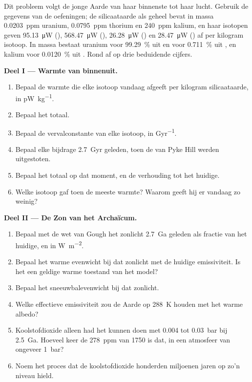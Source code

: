 \begin{problem}\label{pb:b2:precambrian-earth:1}
Dit probleem volgt de jonge Aarde van haar binnenste tot haar lucht. Gebruik de gegevens van de
oefeningen; de silicaataarde als geheel bevat in massa \qty{0.0203}{ppm} uranium, \qty{0.0795}{ppm}
thorium en \qty{240}{ppm} kalium, en haar isotopen geven \qty{95.13}{\micro W}
(), \qty{568.47}{\micro W} (), \qty{26.28}{\micro W} () en
\qty{28.47}{\micro W} () af per kilogram isotoop. In massa bestaat uranium voor
\qty{99.29}{\percent} uit  en voor \qty{0.711}{\percent} uit , en kalium voor
\qty{0.0120}{\percent} uit . Rond af op drie beduidende cijfers.

\noindent\textbf{Deel I --- Warmte van binnenuit.}
\begin{enumerate}
  \item Bepaal de warmte die elke isotoop vandaag afgeeft per kilogram silicaataarde, in
        \unit{pW.kg^{-1}}.
  \item Bepaal het totaal.
  \item Bepaal de vervalconstante van elke isotoop, in \unit{Gyr^{-1}}.
  \item Bepaal elke bijdrage \qty{2.7}{Gyr} geleden, toen de  van Pyke Hill werden uitgestoten.
  \item Bepaal het totaal op dat moment, en de verhouding tot het huidige.
  \item Welke isotoop gaf toen de meeste warmte? Waarom geeft hij er vandaag zo weinig?
\end{enumerate}

\noindent\textbf{Deel II --- De Zon van het Archaïcum.}
\begin{enumerate}[resume]
  \item Bepaal met de wet van Gough het zonlicht \qty{2.7}{Ga} geleden als fractie van het huidige, en in
        \unit{W.m^{-2}}.
  \item Bepaal het warme evenwicht bij dat zonlicht met de huidige emissiviteit. Is het een geldige warme
        toestand van het model?
  \item Bepaal het sneeuwbalevenwicht bij dat zonlicht.
  \item Welke effectieve emissiviteit zou de Aarde op \qty{288}{K} houden met het warme albedo?
  \item Koolstofdioxide alleen had het kunnen doen met 0.004 tot \qty{0.03}{bar} bij \qty{2.5}{Ga}.
        Hoeveel keer de \qty{278}{ppm} van 1750 is dat, in een atmosfeer van ongeveer
        \qty{1}{bar}?
  \item Noem het proces dat de koolstofdioxide honderden miljoenen
        jaren op zo'n niveau hield.
\end{enumerate}


\end{problem}
